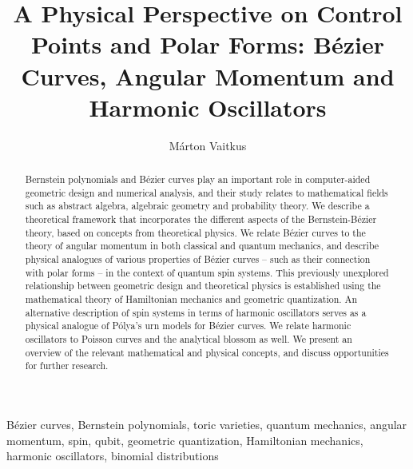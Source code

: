 \documentclass[12pt,final,3p]{elsarticle}
\begin{document}
\begin{frontmatter}

\title{A Physical Perspective on Control Points and Polar Forms: B\'{e}zier Curves, Angular Momentum and Harmonic Oscillators}


\author{Márton Vaitkus}
\address{Budapest University of Technology and Economics}


\begin{abstract}
Bernstein polynomials and B\'{e}zier curves play an important role in computer-aided geometric design and numerical analysis, and their study relates to mathematical fields such as abstract algebra, algebraic geometry and probability theory. We describe a theoretical framework that incorporates the different aspects of the Bernstein-B\'{e}zier theory, based on concepts from theoretical physics. We relate B\'{e}zier curves to the theory of angular momentum in both classical and quantum mechanics, and describe physical analogues of various properties of B\'{e}zier curves -- such as their connection with polar forms -- in the context of quantum spin systems. This previously unexplored relationship between geometric design and theoretical physics is established using the mathematical theory of Hamiltonian mechanics and geometric quantization. An alternative description of spin systems in terms of harmonic oscillators serves as a physical analogue of P\'{o}lya's urn models for B\'{e}zier curves. We relate harmonic oscillators to Poisson curves and the analytical blossom as well. We present an overview of the relevant mathematical and physical concepts, and discuss opportunities for further research.
\end{abstract}

\begin{keyword}
B\'{e}zier curves, Bernstein polynomials, toric varieties, quantum mechanics, angular momentum, spin, qubit, geometric quantization, Hamiltonian mechanics, harmonic oscillators, binomial distributions
\end{keyword}

\end{frontmatter}


\newpage
\end{document}
